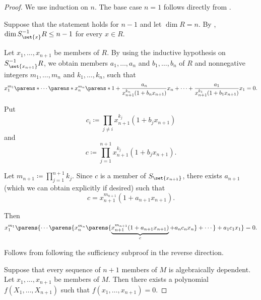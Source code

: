 \begin{proof}
  \SufficiencySubProof* We use induction on \( n \). The base case \( n = 1 \) follows directly from .

  Suppose that the statement holds for \( n - 1 \) and let \( \dim R = n \). By , \( \dim S_{\set{ x }}^{-1} R \leq n - 1 \) for every \( x \in R \).

  Let \( x_1, \ldots, x_{n+1} \) be members of \( R \). By using the inductive hypothesis on \( S_{\set{ x_{n+1} }}^{-1} R \), we obtain members \( a_1, \ldots, a_n \) and \( b_1, \ldots, b_n \) of \( R \) and nonnegative integers \( m_1, \ldots, m_n \) and \( k_1, \ldots, k_n \), such that
  \begin{equation*}
    x_1^{m_1} \parens*{ \cdots \parens*{ x_n^{m_n} \parens*{ 1 + \frac {a_n} {x_{n+1}^{k_n} (1 + b_n x_{n+1}) } x_n } + \cdots } + \frac {a_1} {x_{n+1}^{k_1} (1 + b_1 x_{n+1}) } x_1 } = 0.
  \end{equation*}

  Put
  \begin{equation*}
    c_i \coloneqq \prod_{j \neq i} x_{n+1}^{k_j} (1 + b_j x_{n+1})
  \end{equation*}
  and
  \begin{equation*}
    c \coloneqq \prod_{j=1}^{n+1} x_{n+1}^{k_j} (1 + b_j x_{n+1}).
  \end{equation*}

  Let \( m_{n+1} \coloneqq \prod_{j=1}^{n+1} k_j \). Since \( c \) is a member of \( S_{\set{ x_{n+1} }} \), there exists \( a_{n+1} \) (which we can obtain explicitly if desired) such that
  \begin{equation*}
    c = x_{n+1}^{m_{n+1}} (1 + a_{n+1} x_{n+1}).
  \end{equation*}

  Then
  \begin{equation*}
    x_1^{m_1} \parens{ \cdots \parens{ x_n^{m_n} \parens{ \underbrace{ x_{n+1}^{m_{n+1}} (1 + a_{n+1} x_{n+1}) }_c + a_n c_n x_n } + \cdots } + a_1 c_1 x_1 } = 0.
  \end{equation*}

  \NecessitySubProof* Follows from following the sufficiency subproof in the reverse direction.

   Suppose that every sequence of \( n + 1 \) members of \( M \) is algebraically dependent. Let \( x_1, \ldots, x_{n+1} \) be members of \( M \). Then there exists a polynomial \( f(X_1, \ldots, X_{n+1}) \) such that \( f(x_1, \ldots, x_{n+1}) = 0 \).


\end{proof}
